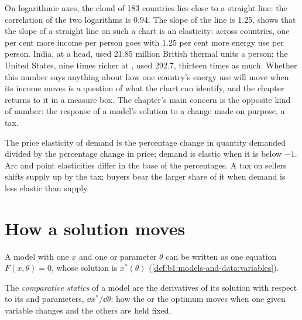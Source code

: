 On logarithmic axes, the cloud of 183 countries lies close to a straight
line: the correlation of the two logarithms is $0.94$. %
The slope of the line is 1.25. %
 shows that the slope of a
straight line on such a chart is an elasticity: across countries, one per
cent more income per person goes with 1.25 per cent more energy use per
person. India, at  a head, used 21.85 million British thermal
units a person; the United States, nine times richer at , used
292.7, thirteen times as much. %
Whether this number says anything about how one country's energy use will
move when its income moves is a question of what the chart can identify,
and the chapter returns to it in a measure box. The chapter's main concern
is the opposite kind of number: the response of a model's solution to a
change made on purpose, a tax.

\begin{recall}
The price elasticity of demand is the percentage change in quantity
demanded divided by the percentage change in price; demand is elastic when
it is below $-1$. Arc and point elasticities differ in the base of the
percentages. A tax on sellers shifts supply up by the tax; buyers bear the
larger share of it when demand is less elastic than supply.
\end{recall}

\section{How a solution moves}\label{sec:b1:comparative-statics:moves}

A model with one  $x$ and one  or
parameter $\theta$ can be written as one equation $F(x, \theta) = 0$, whose
solution is $x^*(\theta)$ (\cref{def:b1:models-and-data:variables}).

\begin{definition}\label{def:b1:comparative-statics:comparative-statics}
The \emph{comparative statics} of a model are the derivatives of its
solution with respect to its  and parameters,
$\dd x^*/\dd\theta$: how the  or the optimum moves when one given
variable changes and the others are held fixed.
\end{definition}

